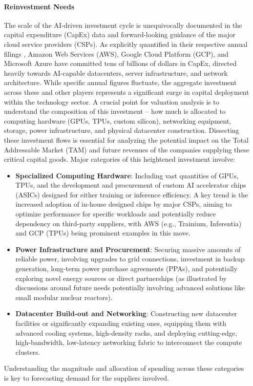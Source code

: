 \paragraph{Reinvestment Needs}
The scale of the AI-driven investment cycle is unequivocally documented in the capital expenditure (CapEx) data and forward-looking guidance of the major cloud service providers (CSPs). As explicitly quantified in their respective annual filings \parencite{amazon202410k, alphabet202410k, microsoft202410k}, Amazon Web Services (AWS), Google Cloud Platform (GCP), and Microsoft Azure have committed tens of billions of dollars in CapEx, directed heavily towards AI-capable datacenters, server infrastructure, and network architecture. While specific annual figures fluctuate, the aggregate investment across these and other players represents a significant surge in capital deployment within the technology sector. A crucial point for valuation analysis is to understand the composition of this investment – how much is allocated to computing hardware (GPUs, TPUs, custom silicon), networking equipment, storage, power infrastructure, and physical datacenter construction. Dissecting these investment flows is essential for analyzing the potential impact on the Total Addressable Market (TAM) and future revenues of the companies supplying these critical capital goods. Major categories of this heightened investment involve:
\begin{itemize}
    \item \textbf{Specialized Computing Hardware}: Including vast quantities of GPUs, TPUs, and the development and procurement of custom AI accelerator chips (ASICs) designed for either training or inference efficiency. A key trend is the increased adoption of in-house designed chips by major CSPs, aiming to optimize performance for specific workloads and potentially reduce dependency on third-party suppliers, with AWS (e.g., Trainium, Inferentia) and GCP (TPUs) being prominent examples in this move.
    \item \textbf{Power Infrastructure and Procurement}: Securing massive amounts of reliable power, involving upgrades to grid connections, investment in backup generation, long-term power purchase agreements (PPAs), and potentially exploring novel energy sources or direct partnerships (as illustrated by discussions around future needs potentially involving advanced solutions like small modular nuclear reactors).
    \item \textbf{Datacenter Build-out and Networking}: Constructing new datacenter facilities or significantly expanding existing ones, equipping them with advanced cooling systems, high-density racks, and deploying cutting-edge, high-bandwidth, low-latency networking fabric to interconnect the compute clusters.
\end{itemize}
Understanding the magnitude and allocation of spending across these categories is key to forecasting demand for the suppliers involved.

